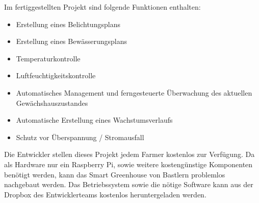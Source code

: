 Im fertiggestellten Projekt sind folgende Funktionen enthalten:\\

\begin{itemize} 
	\item Erstellung eines Belichtungsplans
	\item Erstellung eines Bewässerungsplans
	\item Temperaturkontrolle
	\item Luftfeuchtigkeitskontrolle
	\item Automatisches Management und ferngesteuerte Überwachung des aktuellen Gewächshauszustandes
	\item Automatische Erstellung eines Wachstumsverlaufs
	\item Schutz vor Überspannung / Stromausfall
\end{itemize}

Die Entwickler stellen dieses Projekt jedem Farmer kostenlos zur Verfügung. Da als Hardware nur ein Raspberry Pi, sowie weitere kostengünstige Komponenten benötigt werden, kann das Smart Greenhouse von Bastlern problemlos nachgebaut werden.
Das Betriebssystem sowie die nötige Software kann aus der Dropbox des Entwicklerteams kostenlos heruntergeladen werden\cite{z:smartgreenhouse}.
